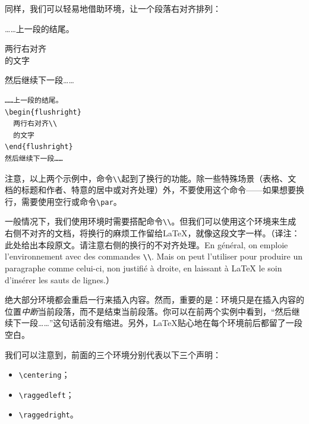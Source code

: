 同样，我们可以轻易地借助环境，让一个段落右对齐排列：

\begin{codelist}[2.6]{
    ……上一段的结尾。
    \begin{flushright}
      两行右对齐\\
      的文字
    \end{flushright}
    然后继续下一段……
    }{
\begin{verbatim}……上一段的结尾。
\begin{flushright}
  两行右对齐\\
  的文字
\end{flushright}
然后继续下一段……
\end{verbatim}
    }
\end{codelist}

注意，以上两个示例中，命令\verb|\\|起到了换行的功能。除一些特殊场景（表格、文档的标题和作者、特意的居中或对齐处理）外，不要使用这个命令——如果想要换行，需要使用空行或命令\verb|\par|。

\begin{flushleft}
    一般情况下，我们使用环境时需要搭配命令\verb|\\|。但我们可以使用这个环境来生成右侧不对齐的文档，将换行的麻烦工作留给\LaTeX ，就像这段文字一样。（译注：此处给出本段原文。请注意右侧的换行的不对齐处理。En général, on emploie l'environnement  avec des commandes \verb|\\|. Mais on peut l'utiliser pour produire un paragraphe comme celui-ci, non justifié à droite, en laissant à \LaTeX{} le soin d’insérer les sauts de lignes.）
\end{flushleft}

\begin{exclamation}
    绝大部分环境都会重启一行来插入内容。然而，重要的是：环境只是在插入内容的位置\emph{中断}当前段落，而不是结束当前段落。你可以在前两个实例中看到，“然后继续下一段……”这句话前没有缩进。另外，\LaTeX 贴心地在每个环境前后都留了一段空白。
\end{exclamation}

我们可以注意到，前面的三个环境分别代表以下三个声明：

\begin{itemize}
    \item \verb|\centering|；
    \item \verb|\raggedleft|；
    \item \verb|\raggedright|。
\end{itemize}

